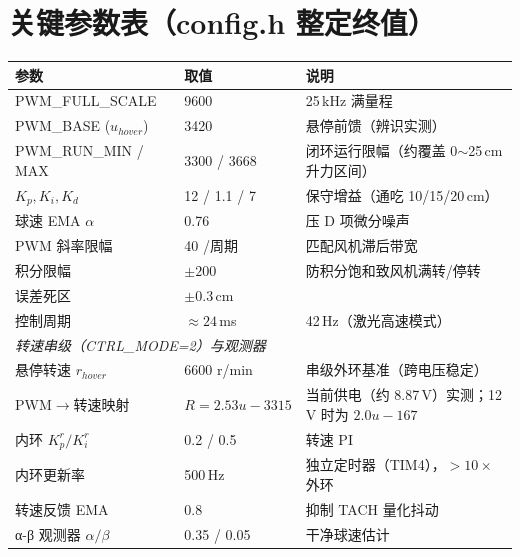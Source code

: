 \documentclass[12pt,a4paper]{ctexart}
\begin{document}
\section{关键参数表（config.h 整定终值）}
\begin{table}[H]
\centering
\begin{tabular}{lll}
\toprule
参数 & 取值 & 说明 \\
\midrule
PWM\_FULL\_SCALE & 9600 & 25\,kHz 满量程 \\
PWM\_BASE ($u_{hover}$) & 3420 & 悬停前馈（辨识实测） \\
PWM\_RUN\_MIN / MAX & 3300 / 3668 & 闭环运行限幅（约覆盖 0$\sim$25\,cm 升力区间） \\
$K_p,K_i,K_d$ & 12 / 1.1 / 7 & 保守增益（通吃 10/15/20\,cm） \\
球速 EMA $\alpha$ & 0.76 & 压 D 项微分噪声 \\
PWM 斜率限幅 & 40 /周期 & 匹配风机滞后带宽 \\
积分限幅 & $\pm200$ & 防积分饱和致风机满转/停转 \\
误差死区 & $\pm0.3$\,cm & \\
控制周期 & $\approx24$\,ms & 42\,Hz（激光高速模式） \\
\midrule
\multicolumn{3}{l}{\emph{转速串级（CTRL\_MODE=2）与观测器}} \\
悬停转速 $r_{hover}$ & 6600 r/min & 串级外环基准（跨电压稳定） \\
PWM$\to$转速映射 & $R{=}2.53u{-}3315$ & 当前供电（约 8.87\,V）实测；12\,V 时为 $2.0u{-}167$ \\
内环 $K_p^r / K_i^r$ & 0.2 / 0.5 & 转速 PI \\
内环更新率 & 500\,Hz & 独立定时器（TIM4），$>10\times$ 外环 \\
转速反馈 EMA & 0.8 & 抑制 TACH 量化抖动 \\
α-β 观测器 $\alpha/\beta$ & 0.35 / 0.05 & 干净球速估计 \\
\bottomrule
\end{tabular}
\end{table}
\end{document}
